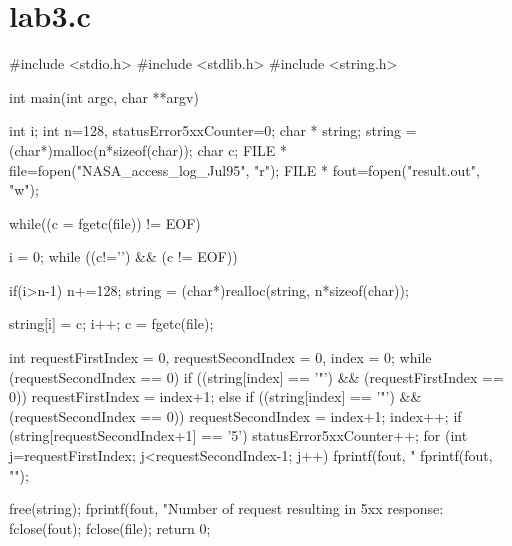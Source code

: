 \documentclass[a4paper,14pt]{article}
\begin{document}
\section{lab3.c}
\begin{python}
#include <stdio.h>
#include <stdlib.h>
#include <string.h>

int main(int argc, char **argv) {
    int i;
    int n=128, statusError5xxCounter=0;
    char * string;
    string = (char*)malloc(n*sizeof(char));
    char c;
    FILE * file=fopen("NASA_access_log_Jul95", "r");
    FILE * fout=fopen("result.out", "w");

    while((c = fgetc(file)) != EOF)
    {
        i = 0;
           while ((c!='\n') && (c != EOF))
           {
               if(i>n-1)
            {
                n+=128;
                string = (char*)realloc(string, n*sizeof(char));
            }

            string[i] = c;
            i++;
            c = fgetc(file);
        }
        int requestFirstIndex = 0, requestSecondIndex = 0, index = 0;
        while (requestSecondIndex == 0)
        {
            if ((string[index] == '"') && (requestFirstIndex == 0))
            {
                requestFirstIndex = index+1;
            } else if ((string[index] == '"') && (requestSecondIndex == 0))
            {
                requestSecondIndex = index+1;
            }
            index++;
        }
        if (string[requestSecondIndex+1] == '5')
        {
            statusError5xxCounter++;
            for (int j=requestFirstIndex; j<requestSecondIndex-1; j++)
                fprintf(fout, "%
            fprintf(fout, "\n");
        }
    }
    free(string);
    fprintf(fout, "Number of request resulting in 5xx response: %
    fclose(fout);
    fclose(file);
    return 0;
}
\end{python}
\end{document}

